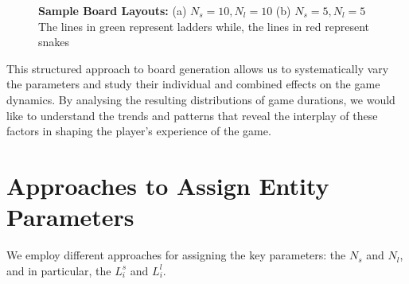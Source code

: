 \begin{figure}
	\centering
	\caption{\textbf{Sample Board Layouts:} (a) $N_s = 10, N_l=10$ (b) $N_s=5, N_l=5$ \linebreak The lines in green represent ladders while, the lines in red represent snakes}
	\label{fig:board_chap2}
\end{figure}


This structured approach to board generation allows us to systematically vary the parameters and study their individual and combined effects on the game dynamics. By analysing the resulting distributions of game durations, we would like to understand the trends and patterns that reveal the interplay of these factors in shaping the player's experience of the game.

\section{Approaches to Assign Entity Parameters}

We employ different approaches for assigning the key parameters: the $N_s$ and $N_l$, and in particular, the $L^{s}_{i}$ and $L^{l}_{i}$.

